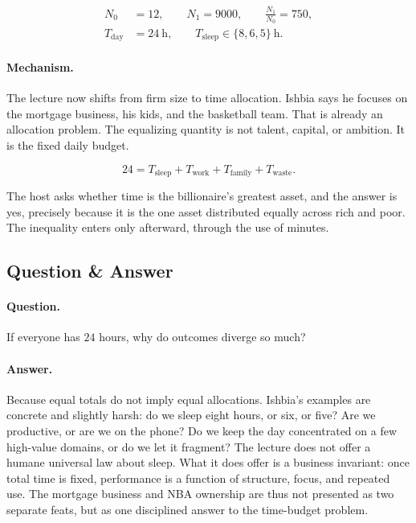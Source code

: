 \begin{align}
N_0 &= 12,\qquad N_1 = 9000,\qquad \frac{N_1}{N_0} = 750,\\
T_{\text{day}} &= 24\ \mathrm{h},\qquad T_{\text{sleep}} \in \{8,6,5\}\ \mathrm{h}.
\end{align}

\paragraph{Mechanism.} The lecture now shifts from firm size to time allocation. Ishbia says he focuses on the mortgage business, his kids, and the basketball team. That is already an allocation problem. The equalizing quantity is not talent, capital, or ambition. It is the fixed daily budget.

\begin{equation}
24 = T_{\text{sleep}} + T_{\text{work}} + T_{\text{family}} + T_{\text{waste}}.
\end{equation}

The host asks whether time is the billionaire's greatest asset, and the answer is yes, precisely because it is the one asset distributed equally across rich and poor. The inequality enters only afterward, through the use of minutes.

\subsection{Question \& Answer}

\paragraph{Question.} If everyone has \(24\) hours, why do outcomes diverge so much?

\paragraph{Answer.} Because equal totals do not imply equal allocations. Ishbia's examples are concrete and slightly harsh: do we sleep eight hours, or six, or five? Are we productive, or are we on the phone? Do we keep the day concentrated on a few high-value domains, or do we let it fragment? The lecture does not offer a humane universal law about sleep. What it does offer is a business invariant: once total time is fixed, performance is a function of structure, focus, and repeated use. The mortgage business and NBA ownership are thus not presented as two separate feats, but as one disciplined answer to the time-budget problem.

